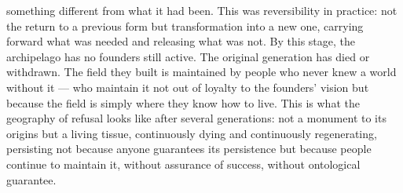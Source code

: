 something different from what it had been. This was reversibility in practice: not the return to a previous form but transformation into a new one, carrying forward what was needed and releasing what was not. By this stage, the archipelago has no founders still active. The original generation has died or withdrawn. The field they built is maintained by people who never knew a world without it — who maintain it not out of loyalty to the founders’ vision but because the field is simply where they know how to live. This is what the geography of refusal looks like after several generations: not a monument to its origins but a living tissue, continuously dying and continuously regenerating, persisting not because anyone guarantees its persistence but because people continue to maintain it, without assurance of success, without ontological guarantee.

